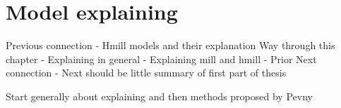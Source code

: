 \chapter{Model explaining}


Previous connection
- Hmill models and their explanation
Way through this chapter
- Explaining in general
- Explaining mill and hmill
- Prior
Next connection
- Next should be little summary of first part of thesis


Start generally about explaining and then methods proposed by Pevny